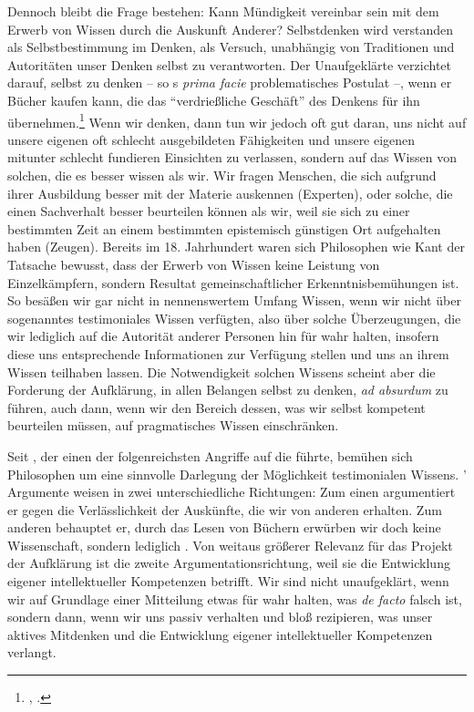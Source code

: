 Dennoch bleibt die Frage bestehen: Kann Mündigkeit vereinbar sein mit dem Erwerb
von Wissen durch die Auskunft Anderer? Selbstdenken wird verstanden als Selbstbestimmung im Denken, als
Versuch, unabhängig von Traditionen und Autoritäten unser Denken selbst zu
verantworten. Der Unaufgeklärte verzichtet darauf, selbst zu denken -- so
s \emph{prima facie} problematisches Postulat --, wenn er
Bücher kaufen kann, die das \enquote{verdrießliche Geschäft} des Denkens für
ihn übernehmen.\footnote{\cite[][A
482]{Kant:BeantwortungderFrage:WasistAufklaerung?1977}, \cite[][VIII:
35.13--16]{Kant:GesammelteWerke1900ff.}.} Wenn wir denken, dann tun wir jedoch
oft gut daran, uns nicht auf unsere eigenen oft schlecht ausgebildeten
Fähigkeiten und unsere eigenen mitunter schlecht fundieren Einsichten zu
verlassen, sondern auf das Wissen von solchen, die es besser wissen als wir. Wir
fragen Menschen, die sich aufgrund ihrer Ausbildung besser mit der Materie
auskennen (Experten), oder solche, die einen Sachverhalt besser beurteilen
können als wir, weil sie sich zu einer bestimmten Zeit an einem bestimmten
epistemisch günstigen Ort aufgehalten haben (Zeugen). Bereits im 18.
Jahrhundert waren sich Philosophen wie Kant der Tatsache bewusst, dass der
Erwerb von Wissen keine Leistung von Einzelkämpfern, sondern Resultat
gemeinschaftlicher Erkenntnisbemühungen ist. So besäßen wir gar
nicht in nennenswertem Umfang Wissen, wenn wir nicht über sogenanntes testimoniales
Wissen verfügten, also über solche Überzeugungen, die wir lediglich auf die
Autorität anderer Personen hin für wahr halten, insofern diese uns entsprechende
Informationen zur Verfügung stellen und uns an ihrem Wissen teilhaben lassen.
Die Notwendigkeit solchen Wissens scheint aber die Forderung der Aufklärung, in
allen Belangen selbst zu denken, \emph{ad absurdum} zu führen, auch dann, wenn
wir den Bereich dessen, was wir selbst kompetent beurteilen müssen, auf
pragmatisches Wissen einschränken.

Seit , der einen der
folgenreichsten Angriffe auf die  führte,
bemühen sich Philosophen um eine sinnvolle Darlegung der Möglichkeit
testimonialen Wissens. ' Argumente
weisen in zwei unterschiedliche Richtungen: Zum einen argumentiert er gegen die
Verlässlichkeit der Auskünfte, die wir von anderen erhalten. Zum anderen
behauptet er, durch das Lesen von Büchern erwürben wir doch keine Wissenschaft,
sondern lediglich . Von weitaus größerer
Relevanz für das Projekt der Aufklärung ist die zweite Argumentationsrichtung,
weil sie die Entwicklung eigener intellektueller Kompetenzen betrifft. Wir sind
nicht unaufgeklärt, wenn wir auf Grundlage einer Mitteilung etwas für wahr
halten, was \emph{de facto} falsch ist, sondern dann, wenn wir uns passiv
verhalten und bloß rezipieren, was unser aktives Mitdenken und die Entwicklung
eigener intellektueller Kompetenzen verlangt.


